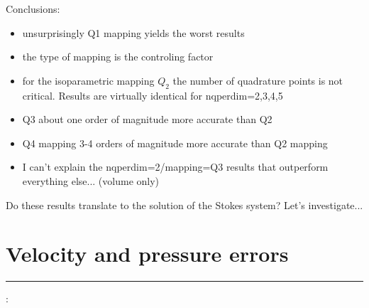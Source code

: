 Conclusions:
\begin{itemize}
\item unsurprisingly Q1 mapping yields the worst results
\item the type of mapping is the controling factor
\item for the isoparametric mapping $Q_2$ the number of quadrature points 
is not critical. Results are virtually identical for nqperdim=2,3,4,5
\item Q3 about one order of magnitude more accurate than Q2 
\item Q4 mapping 3-4 orders of magnitude more accurate than Q2 mapping
\item I can't explain the nqperdim=2/mapping=Q3 results that outperform everything else... (volume only)
\end{itemize}

Do these results translate to the solution of the Stokes system? Let's investigate...

\section*{Velocity and pressure errors}











\par\noindent\rule{\textwidth}{0.4pt}

\vspace{.5cm}

\begin{center}
\end{center}

\vspace{.5cm}

\Literature:\\


